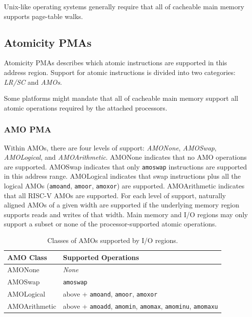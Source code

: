 \begin{commentary}
Unix-like operating systems generally require that all of cacheable main
memory supports page-table walks.
\end{commentary}

\subsection{Atomicity PMAs}

Atomicity PMAs describes which atomic instructions are supported in
this address region.
Support for atomic instructions is divided into two
categories: {\em LR/SC} and {\em AMOs}.

\begin{commentary}
Some platforms might mandate that all of cacheable main memory support
all atomic operations required by the attached processors.
\end{commentary}

\subsubsection{AMO PMA}

  Within AMOs, there are four levels of
support: {\em AMONone}, {\em AMOSwap}, {\em AMOLogical}, and {\em
  AMOArithmetic}.  AMONone indicates that no AMO operations are
supported.  AMOSwap indicates that only {\tt amoswap} instructions are
supported in this address range.  AMOLogical indicates that swap
instructions plus all the logical AMOs ({\tt amoand}, {\tt amoor},
{\tt amoxor}) are supported.  AMOArithmetic indicates that all RISC-V
AMOs are supported.  For each level of support, naturally aligned AMOs
of a given width are supported if the underlying memory region
supports reads and writes of that width.
Main memory and I/O regions may only support a subset or none of the
processor-supported atomic operations.

\begin{table}[h!]
\begin{center}
\begin{tabular}{|l|l|}
  \hline
  AMO Class & Supported Operations \\
  \hline
  AMONone       & {\em None} \\
  AMOSwap       & {\tt amoswap} \\
  AMOLogical    & above + {\tt amoand}, {\tt amoor}, {\tt amoxor} \\
  AMOArithmetic & above + {\tt amoadd}, {\tt amomin}, {\tt amomax}, {\tt amominu}, {\tt amomaxu} \\
  \hline
\end{tabular}
\end{center}
\caption{Classes of AMOs supported by I/O regions.}
\label{amoclasses}
\end{table}

